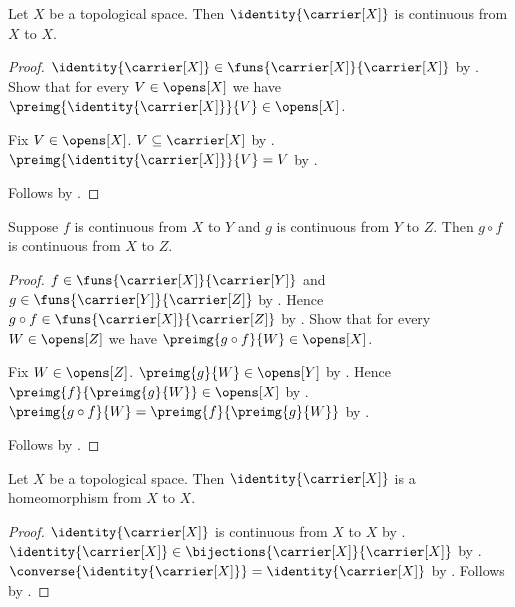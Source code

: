 \begin{proposition}\label{identity_continuous}
    Let $X$ be a topological space.
    Then $\identity{\carrier[X]}$ is continuous from $X$ to $X$.
\end{proposition}
\begin{proof}
    $\identity{\carrier[X]}\in
        \funs{\carrier[X]}{\carrier[X]}$
        by .
    Show that for every $V\in\opens[X]$ we have
        $\preimg{\identity{\carrier[X]}}{V}\in\opens[X]$.
    \begin{subproof}
        Fix $V\in\opens[X]$.
        $V\subseteq\carrier[X]$ by .
        $\preimg{\identity{\carrier[X]}}{V}=V$
            by .
    \end{subproof}
    Follows by .
\end{proof}

\begin{theorem}\label{continuous_composition}
    Suppose $f$ is continuous from $X$ to $Y$ and
        $g$ is continuous from $Y$ to $Z$.
    Then $g\circ f$ is continuous from $X$ to $Z$.
\end{theorem}
\begin{proof}
    $f\in\funs{\carrier[X]}{\carrier[Y]}$ and
        $g\in\funs{\carrier[Y]}{\carrier[Z]}$
        by .
    Hence $g\circ f\in\funs{\carrier[X]}{\carrier[Z]}$
        by .
    Show that for every $W\in\opens[Z]$ we have
        $\preimg{g\circ f}{W}\in\opens[X]$.
    \begin{subproof}
        Fix $W\in\opens[Z]$.
        $\preimg{g}{W}\in\opens[Y]$
            by .
        Hence $\preimg{f}{\preimg{g}{W}}\in\opens[X]$
            by .
        $\preimg{g\circ f}{W}
            =\preimg{f}{\preimg{g}{W}}$
            by .
    \end{subproof}
    Follows by .
\end{proof}

\begin{classification}\label{identity_homeomorphism}
    Let $X$ be a topological space.
    Then $\identity{\carrier[X]}$ is a homeomorphism from $X$ to $X$.
\end{classification}
\begin{proof}
    $\identity{\carrier[X]}$ is continuous from $X$ to $X$ by .
    $\identity{\carrier[X]}\in\bijections{\carrier[X]}{\carrier[X]}$ by .
    $\converse{\identity{\carrier[X]}}=\identity{\carrier[X]}$ by .
    Follows by .
\end{proof}


